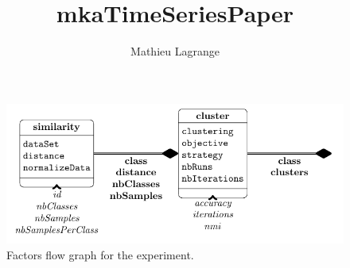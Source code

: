 \documentclass[12pt,a4paper,fleqn]{tufte-handout}
\title{mkaTimeSeriesPaper}
\author{ Mathieu Lagrange }
\begin{document}
                
 
\maketitle                
 
 
 
 
 
 
 
\begin{center}              
 
 
\begin{figure}             
 
 
\includegraphics[width=\textwidth,height=0.8\textheight,keepaspectratio]{../figures/factors.pdf}            
 
 
\label{factorFlowGraph}           
 
 
\caption{Factors flow graph for the experiment.}          
 
 
\end{figure}         
 
 
\end{center}        
 
\end{document}
